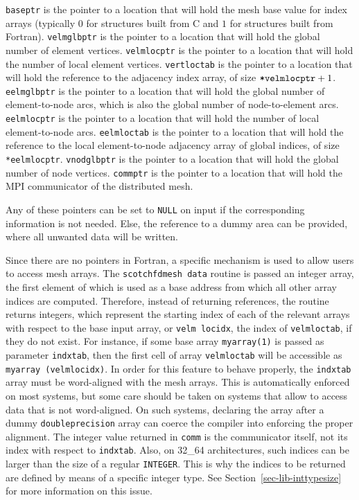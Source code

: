 \begin{itemize}
\texttt{baseptr} is the pointer to a location that will hold the mesh
base value for index arrays (typically $0$ for structures built from C
and $1$ for structures built from Fortran).
\texttt{velmglbptr} is the pointer to a location that will hold the
global number of element vertices.
\texttt{velmlocptr} is the pointer to a location that will hold the
number of local element vertices.
\texttt{vertloctab} is the pointer to a location that will hold the
reference to the adjacency index array, of size
$\mbox{\tt *velmlocptr} + 1$.
\texttt{eelmglbptr} is the pointer to a location that will hold the
global number of element-to-node arcs, which is also the global number
of node-to-element arcs.
\texttt{eelmlocptr} is the pointer to a location that will hold the
number of local element-to-node arcs.
\texttt{eelmloctab} is the pointer to a location that will hold the
reference to the local element-to-node adjacency array of global
indices, of size \texttt{*eelmlocptr}.
\texttt{vnodglbptr} is the pointer to a location that will hold the
global number of node vertices.
{\tt commptr} is the pointer to a location that will hold the MPI
communicator of the distributed mesh.

Any of these pointers can be set to {\tt NULL} on input if the
corresponding information is not needed. Else, the reference to a
dummy area can be provided, where all unwanted data will be written.

Since there are no pointers in Fortran, a specific mechanism is used
to allow users to access mesh arrays. The \texttt{scotchf\lbt dmesh\lbt
data} routine is passed an integer array, the first element of which
is used as a base address from which all other array indices are
computed. Therefore, instead of returning references, the routine
returns integers, which represent the starting index of each of the
relevant arrays with respect to the base input array, or \texttt{velm\lbt
loc\lbt idx}, the index of \texttt{velm\lbt loc\lbt tab}, if they do not
exist. For instance, if some base array \texttt{myarray\lbt (1)} is
passed as parameter \texttt{indxtab}, then the first cell of array
\texttt{velm\lbt loc\lbt tab} will be accessible as {\tt myarray\lbt
(velm\lbt loc\lbt idx)}.
In order for this feature to behave properly, the {\tt indxtab}
array must be word-aligned with the mesh arrays. This is
automatically enforced on most systems, but some care should be
taken on systems that allow to access data that is not
word-aligned. On such systems, declaring the array after a
dummy {\tt double\lbt precision} array can coerce the compiler
into enforcing the proper alignment. The integer value returned in
{\tt comm} is the communicator itself, not its index with respect to
{\tt indxtab}. Also, on 32\_64 architectures,
such indices can be larger than the size of a regular
{\tt INTEGER}. This is why the indices to be returned are defined by
means of a specific integer type. See
Section~\ref{sec-lib-inttypesize} for more information on this
issue.
\end{itemize}

